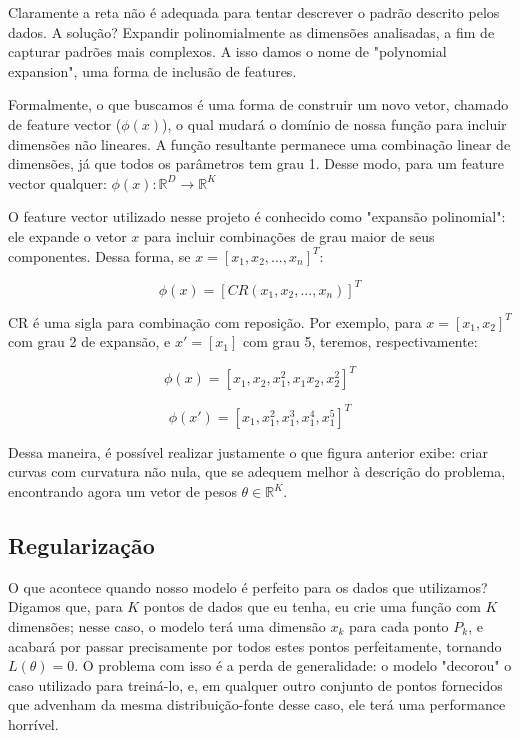\documentclass{article}
\begin{document}
Claramente a reta não é adequada para tentar descrever o 
padrão descrito pelos dados. A solução? Expandir polinomialmente
as dimensões analisadas, a fim de capturar padrões mais 
complexos. A isso damos o nome de "polynomial expansion", uma
forma de inclusão de features.

Formalmente, o que buscamos é uma forma de construir um novo
vetor, chamado de feature vector ($\phi(x)$), o qual mudará
o domínio de nossa função para incluir dimensões não lineares.
A função resultante permanece uma combinação linear de dimensões,
já que todos os parâmetros tem grau 1. Desse modo, para
um feature vector qualquer: $\phi(x): \mathbb{R}^{D} \rightarrow
\mathbb{R}^{K}$

O feature vector utilizado nesse projeto é conhecido como
"expansão polinomial": ele expande o vetor $x$ para incluir
combinações de grau maior de seus componentes. Dessa forma,
se $x = [x_{1}, x_{2}, ..., x_{n}]^{T}$:

\begin{equation}
    \phi(x) = [CR(x_{1}, x_{2}, ..., x_{n})]^{T} 
\end{equation}

CR é uma sigla para combinação com reposição. Por exemplo, para
$x = [x_{1}, x_{2}]^{T}$ com grau 2 de expansão, e 
$x' = [x_{1}]$ com grau 5, teremos, respectivamente:

\begin{equation}
    \phi(x) = [x_{1}, x_{2}, x_{1}^{2}, x_{1}x_{2}, x_{2}^{2}]^{T} 
\end{equation}

\begin{equation}
    \phi(x') = [x_{1}, x_{1}^{2}, x_{1}^{3}, x_{1}^{4}, x_{1}^{5}]^{T} 
\end{equation}

Dessa maneira, é possível realizar justamente o que  figura 
anterior exibe: criar curvas com curvatura não nula, que se
adequem melhor à descrição do problema, encontrando agora 
um vetor de pesos $\theta \in \mathbb{R}^{K}$. 

\subsection{Regularização}
 
O que acontece quando nosso modelo é perfeito para os dados
que utilizamos? Digamos que, para $K$ pontos de dados que eu
tenha, eu crie uma função com $K$ dimensões; nesse caso, o modelo
terá uma dimensão $x_{k}$ para cada ponto $P_{k}$, e acabará
por passar precisamente por todos estes pontos perfeitamente,
tornando $L(\theta) = 0$. O problema com isso é a perda de 
generalidade: o modelo "decorou" o caso utilizado para treiná-lo,
e, em qualquer outro conjunto de pontos fornecidos que advenham
da mesma distribuição-fonte desse caso, ele terá uma 
performance horrível.
\end{document}

